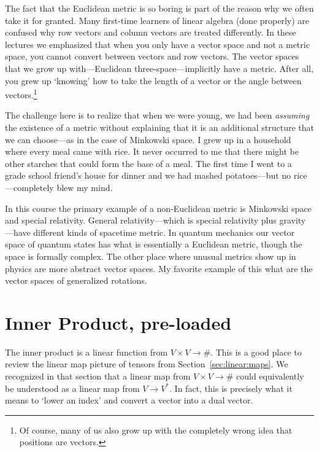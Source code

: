 \documentclass[12pt, oneside]{report}    %
\let\oldsection\section
\def\section{%
  \setcounter{sidenote}{1}%
  \oldsection
}
\begin{document}
\begin{example}
The fact that the Euclidean metric is so boring is part of the reason why we often take it for granted. Many first-time learners of linear algebra (done properly) are confused why row vectors and column vectors are treated differently. In these lectures we emphasized that when you only have a vector space and not a metric space, you cannot convert between vectors and row vectors. The vector spaces that we grow up with---Euclidean three-space---implicitly have a metric. After all, you grew up `knowing' how to take the length of a vector or the angle between vectors.\footnote{Of course, many of us also grow up with the completely wrong idea that positions are vectors.} 

The challenge here is to realize that when we were young, we had been \emph{assuming} the existence of a metric without explaining that it is an additional structure that we can choose---as in the case of Minkowski space. I grew up in a household where every meal came with rice. It never occurred to me that there might be other starches that could form the base of a meal. The first time I went to a grade school friend's house for dinner and we had mashed potatoes---but no rice---completely blew my mind. 
\end{example}

In this course the primary example of a non-Euclidean metric is Minkowski space and special relativity. General relativity---which is special relativity plus gravity---have different kinds of spacetime metric. In quantum mechanics our vector space of quantum states has what is essentially a Euclidean metric, though the space is formally complex. The other place where unusual metrics show up in physics are more abstract vector spaces. My favorite example of this what are the vector spaces of generalized rotations.

\section{Inner Product, pre-loaded}\label{eq:inner:product:pre:loaded}

The inner product is a linear function from $V\times V \to \#$. This is a good place to review the linear map picture of tensors from Section~\ref{sec:linear:maps}. We recognized in that section that a linear map from $V\times V \to \#$ could equivalently be understood as a linear map from $V \to V^*$. In fact, this is precisely what it means to `lower an index' and convert a vector into a dual vector.
\end{document}
